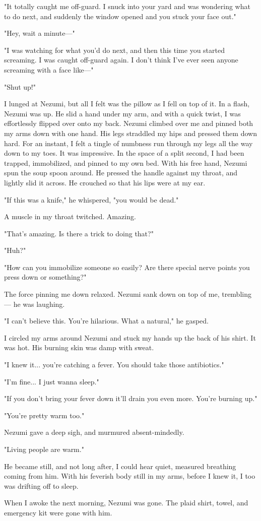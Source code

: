 "It totally caught me off-guard. I snuck into your yard and was
wondering what to do next, and suddenly the window opened and you stuck
your face out."

"Hey, wait a minute---"

"I was watching for what you'd do next, and then this time you started
screaming. I was caught off-guard again. I don't think I've ever seen
anyone screaming with a face like---"

"Shut up!"

I lunged at Nezumi, but all I felt was the pillow as I fell on top of
it. In a flash, Nezumi was up. He slid a hand under my arm, and with a
quick twist, I was effortlessly flipped over onto my back. Nezumi
climbed over me and pinned both my arms down with one hand. His legs
straddled my hips and pressed them down hard. For an instant, I felt a
tingle of numbness run through my legs all the way down to my toes. It
was impressive. In the space of a split second, I had been trapped,
immobilized, and pinned to my own bed. With his free hand, Nezumi spun
the soup spoon around. He pressed the handle against my throat, and
lightly slid it across. He crouched so that his lips were at my ear.

"If this was a knife," he whispered, "you would be dead."

A muscle in my throat twitched. Amazing.

"That's amazing. Is there a trick to doing that?"

"Huh?"

"How can you immobilize someone so easily? Are there special nerve
points you press down or something?"

The force pinning me down relaxed. Nezumi sank down on top of me,
trembling --- he was laughing.

"I can't believe this. You're hilarious. What a natural," he gasped.

I circled my arms around Nezumi and stuck my hands up the back of his
shirt. It was hot. His burning skin was damp with sweat.

"I knew it... you're catching a fever. You should take those
antibiotics."

"I'm fine... I just wanna sleep."

"If you don't bring your fever down it'll drain you even more. You're
burning up."

"You're pretty warm too."

Nezumi gave a deep sigh, and murmured absent-mindedly.

"Living people are warm."

He became still, and not long after, I could hear quiet, measured
breathing coming from him. With his feverish body still in my arms,
before I knew it, I too was drifting off to sleep.

When I awoke the next morning, Nezumi was gone. The plaid shirt, towel,
and emergency kit were gone with him.